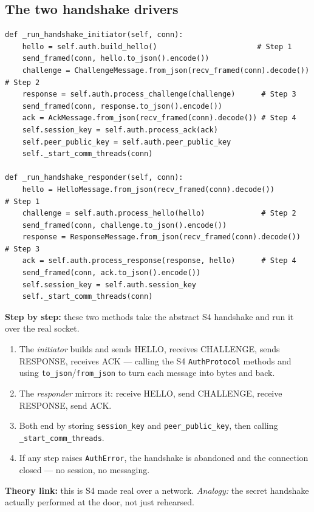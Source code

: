 \documentclass[11pt,a4paper]{report}
\begin{document}
\subsection{The two handshake drivers}
\begin{lstlisting}[style=py,caption={vehicle\_node.py --- driving the 4-step handshake over the socket.}]
def _run_handshake_initiator(self, conn):
    hello = self.auth.build_hello()                       # Step 1
    send_framed(conn, hello.to_json().encode())
    challenge = ChallengeMessage.from_json(recv_framed(conn).decode())  # Step 2
    response = self.auth.process_challenge(challenge)      # Step 3
    send_framed(conn, response.to_json().encode())
    ack = AckMessage.from_json(recv_framed(conn).decode()) # Step 4
    self.session_key = self.auth.process_ack(ack)
    self.peer_public_key = self.auth.peer_public_key
    self._start_comm_threads(conn)

def _run_handshake_responder(self, conn):
    hello = HelloMessage.from_json(recv_framed(conn).decode())          # Step 1
    challenge = self.auth.process_hello(hello)             # Step 2
    send_framed(conn, challenge.to_json().encode())
    response = ResponseMessage.from_json(recv_framed(conn).decode())    # Step 3
    ack = self.auth.process_response(response, hello)      # Step 4
    send_framed(conn, ack.to_json().encode())
    self.session_key = self.auth.session_key
    self._start_comm_threads(conn)
\end{lstlisting}
\textbf{Step by step:} these two methods take the abstract S4 handshake and run
it over the real socket.
\begin{enumerate}
  \item The \emph{initiator} builds and sends HELLO, receives CHALLENGE, sends
        RESPONSE, receives ACK --- calling the S4 \texttt{AuthProtocol} methods
        and using \texttt{to\_json}/\texttt{from\_json} to turn each message into
        bytes and back.
  \item The \emph{responder} mirrors it: receive HELLO, send CHALLENGE, receive
        RESPONSE, send ACK.
  \item Both end by storing \texttt{session\_key} and \texttt{peer\_public\_key},
        then calling \texttt{\_start\_comm\_threads}.
  \item If any step raises \texttt{AuthError}, the handshake is abandoned and the
        connection closed --- no session, no messaging.
\end{enumerate}
\textbf{Theory link:} this is S4 made real over a network. \emph{Analogy:} the
secret handshake actually performed at the door, not just rehearsed.
\end{document}
